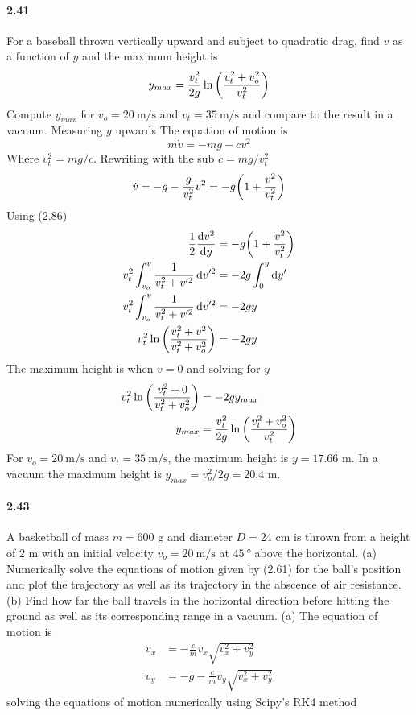 \documentclass[../problems.tex]{subfiles}
\begin{document}
\paragraph{2.41} For a baseball thrown vertically upward and subject to quadratic drag, find $v$ as
a function of $y$ and the maximum height is
\begin{equation*}
    y_{max} = \frac{v_t^2}{2g} \ln\quantity(\frac{v_t^2 + v_o^2}{v_t^2})
\end{equation*}
Compute $y_{max}$ for $v_o = \qty{20}{\m/\s}$ and $v_t = \qty{35}{\m/\s}$ and compare to the result
in a vacuum.
\barh 
Measuring $y$ upwards The equation of motion is
\begin{equation*}
    m \dot{v} = -mg - cv^2
\end{equation*}
Where $v_t^2 = mg/c$. Rewriting with the sub $c=mg/v_t^2$
\begin{align*}
    \dot{v} = -g - \frac{g}{v_t^2} v^2 = -g \quantity(1 + \frac{v^2}{v_t^2})
\end{align*}
Using (2.86)
\begin{align*}
    \frac{1}{2} \dv{v^2}{y} &= -g \quantity(1 + \frac{v^2}{v_t^2}) \\
    v_t^2 \int_{v_o}^v \frac{1}{v_t^2 + v'^2} \dd{v'^2} &= -2g \int_0^y \dd{y'} \\
    v_t^2 \int_{v_o}^v \frac{1}{v_t^2 + v'^2} \dd{v'^2} &= -2g y \\
    v_t^2 \ln\quantity(\frac{v_t^2 + v^2}{v_t^2 + v_o^2}) &= -2g y \\
\end{align*}
The maximum height is when $v=0$ and solving for $y$
\begin{align*}
    v_t^2 \ln\quantity(\frac{v_t^2 + 0}{v_t^2 + v_o^2}) &= -2g y_{max} \\
    y_{max} &= \frac{v_t^2}{2g} \ln\quantity(\frac{v_t^2 + v_o^2}{v_t^2})
\end{align*}
For $v_o = \qty{20}{\m/\s}$ and $v_t = \qty{35}{\m/\s}$, the maximum height is $y = 17.66$ m. In a
vacuum the maximum height is $y_{max} = v_o^2/2g = 20.4$ m.

\paragraph{2.43} A basketball of mass $m=600$ g and diameter $D=24$ cm is thrown from a height of 
2 m with an initial velocity $v_o =\qty{20}{\m/\s}$ at $\qty{45}{\degree}$ above the horizontal. 
(a) Numerically solve the equations of motion given by (2.61) for the ball's position and plot the
trajectory as well as its trajectory in the abscence of air resistance. (b) Find how far the ball
travels in the horizontal direction before hitting the ground as well as its corresponding range in 
a vacuum.
\barh 
(a) The equation of motion is
\begin{align*}
    \dot{v}_x &= -\frac{c}{m} v_x\sqrt{v_x^2 + v_y^2} \\
    \dot{v}_y &= -g - \frac{c}{m} v_y\sqrt{v_x^2 + v_y^2}
\end{align*}
solving the equations of motion numerically using Scipy's RK4 method
\newpage

\end{document}
